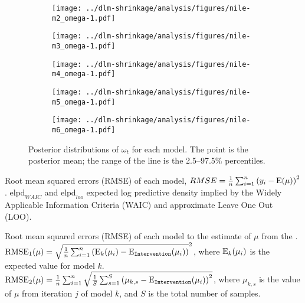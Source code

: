 \begin{figure}[htpb!]
  \centering
  \begin{subfigure}[b]{0.5\linewidth}
    \texttt{[image: ../dlm-shrinkage/analysis/figures/nile-m2\_omega-1.pdf]}    
    \caption{}
  \end{subfigure}%
  \begin{subfigure}[b]{0.5\linewidth}
    \texttt{[image: ../dlm-shrinkage/analysis/figures/nile-m3\_omega-1.pdf]}
    \caption{}
  \end{subfigure}
  \begin{subfigure}[b]{0.5\linewidth}
    \texttt{[image: ../dlm-shrinkage/analysis/figures/nile-m4\_omega-1.pdf]}    
    \caption{}
  \end{subfigure}%
  \begin{subfigure}[b]{0.5\linewidth}
    \texttt{[image: ../dlm-shrinkage/analysis/figures/nile-m5\_omega-1.pdf]}
    \caption{}
  \end{subfigure}
  \begin{subfigure}[b]{0.5\linewidth}
    \texttt{[image: ../dlm-shrinkage/analysis/figures/nile-m6\_omega-1.pdf]}    
    \caption{}
  \end{subfigure}
  \caption{Posterior distributions of $\omega_t$ for each model. The point is the posterior mean; the range of the line is the 2.5--97.5\% percentiles.}
  \label{dlm:fig:nile_omega_posterior}
\end{figure}



\begin{table}[thbp]
  \centering
  
  \caption{
    Root mean squared errors (RMSE) of each model, $RMSE = \frac{1}{n} \sum_{i = 1}^{n} {\left( y_{i} - \operatorname{E}(\mu) \right)}^{2}$.
    $\mathrm{elpd}_{WAIC}$ and $\mathrm{elpd}_{loo}$ expected log predictive density implied by the Widely Applicable Information Criteria (WAIC) and approximate Leave One Out (LOO).
  }
\end{table}

\begin{table}[thbp]
  \centering
  
  \caption{
    Root mean squared errors (RMSE) of each model to the estimate of $\mu$ from the .
    $\mathrm{RMSE}_{1}(\mu) = \sqrt{\frac{1}{n} \sum_{i = 1}^{n} \left(\operatorname{E}_{k}(\mu_{i}) -  \operatorname{E}_{\text{\texttt{Intervention}}}(\mu_{i})\right)}^{2}$, where $\operatorname{E}_{k}(\mu_{i})$ is the expected value for model $k$.
    $\mathrm{RMSE}_{2}(\mu) = \frac{1}{n} \sum_{i = 1}^{n} \sqrt{ \frac{1}{S} \sum_{s = 1}^{S} { \left( \mu_{k, s} -  \operatorname{E}_{\text{\texttt{Intervention}}}(\mu_{i}) \right) }^{2}}$, where $\mu_{k, s}$ is the value of $\mu$ from iteration $j$ of model $k$, and $S$ is the total number of samples. 
  }
\end{table}


